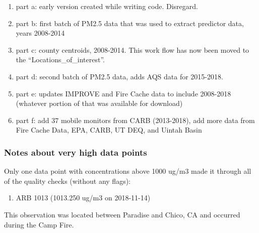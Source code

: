\begin{enumerate}[nolistsep]
\item part a: early version created while writing code. Disregard.
\item part b: first batch of PM2.5 data that was used to extract predictor data, years 2008-2014
\item part c: county centroids, 2008-2014. This work flow has now been moved to the ``Locations\_of\_interest''.
\item part d: second batch of PM2.5 data, adds AQS data for 2015-2018.
\item part e: updates IMPROVE and Fire Cache data to include 2008-2018 (whatever portion of that was available for download)
\item part f: add 37 mobile monitors from CARB (2013-2018), add more data from Fire Cache Data, EPA, CARB, UT DEQ, and Uintah Basin
\end{enumerate}

\subsubsection{Notes about very high data points}

Only one data point with concentrations above 1000 ug/m3 made it through all of the quality checks (without any flags):

\begin{enumerate}[nolistsep]
\item ARB 1013 (1013.250 ug/m3 on 2018-11-14)
\end{enumerate}

This observation was located between Paradise and Chico, CA and occurred during the Camp Fire.

